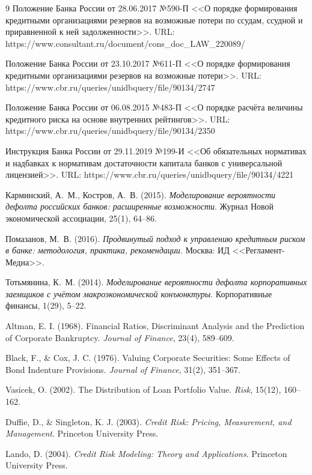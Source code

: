 \documentclass[]{article}
\begin{document}
\begin{thebibliography}{9}
		Положение Банка России от 28.06.2017 №590-П <<О порядке формирования кредитными организациями резервов на возможные потери по ссудам, ссудной и приравненной к ней задолженности>>. URL: https://www.consultant.ru/document/cons\_doc\_LAW\_220089/

		Положение Банка России от 23.10.2017 №611-П <<О порядке формирования кредитными организациями резервов на возможные потери>>. URL: https://www.cbr.ru/queries/unidbquery/file/90134/2747

		Положение Банка России от 06.08.2015 №483-П <<О порядке расчёта величины кредитного риска на основе внутренних рейтингов>>. URL: https://www.cbr.ru/queries/unidbquery/file/90134/2350

		Инструкция Банка России от 29.11.2019 №199-И <<Об обязательных нормативах и надбавках к нормативам достаточности капитала банков с универсальной лицензией>>. URL: https://www.cbr.ru/queries/unidbquery/file/90134/4221

		Карминский, А.~М., Костров, А.~В. (2015). \textit{Моделирование вероятности дефолта российских банков: расширенные возможности}. Журнал Новой экономической ассоциации, 25(1), 64–86.

		Помазанов, М.~В. (2016). \textit{Продвинутый подход к управлению кредитным риском в банке: методология, практика, рекомендации}. Москва: ИД <<Регламент-Медиа>>.

		Тотьмянина, К.~М. (2014). \textit{Моделирование вероятности дефолта корпоративных заемщиков с учётом макроэкономической конъюнктуры}. Корпоративные финансы, 1(29), 5–22.

		Altman, E. I. (1968). Financial Ratios, Discriminant Analysis and the Prediction of Corporate Bankruptcy. \textit{Journal of Finance}, 23(4), 589–609.

		Black, F., \& Cox, J. C. (1976). Valuing Corporate Securities: Some Effects of Bond Indenture Provisions. \textit{Journal of Finance}, 31(2), 351–367.

		Vasicek, O. (2002). The Distribution of Loan Portfolio Value. \textit{Risk}, 15(12), 160–162.

		Duffie, D., \& Singleton, K. J. (2003). \textit{Credit Risk: Pricing, Measurement, and Management}. Princeton University Press.

		Lando, D. (2004). \textit{Credit Risk Modeling: Theory and Applications}. Princeton University Press.


\end{thebibliography}
\end{document}
